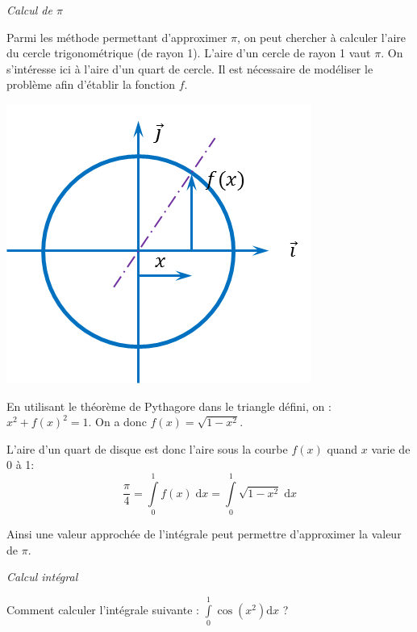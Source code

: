\documentclass[10pt]{article}
\begin{document}
\begin{exemple}
\textit{Calcul de $\pi$}

\begin{minipage}[c]{.7\linewidth}
Parmi les méthode permettant d'approximer $\pi$, on peut chercher à calculer l'aire du cercle trigonométrique (de rayon 1). L'aire d'un cercle de rayon 1 vaut $\pi$. On s'intéresse ici à l'aire d'un quart de cercle. Il est nécessaire de modéliser le problème afin d'établir la fonction $f$.

\end{minipage}\hfill
\begin{minipage}[c]{.25\linewidth}
\begin{center}
\includegraphics[width=.95\textwidth]{images/cercle}
\end{center}
\end{minipage}

En utilisant le théorème de Pythagore dans le triangle défini, on : $x^2 + f(x)^2 = 1$. On a donc $f(x)=\sqrt{1-x^2}$. 

L'aire d'un quart de disque est donc l'aire sous la courbe $f(x)$ quand $x$ varie de 0 à 1:
$$
\dfrac{\pi}{4}=\int\limits_{0}^1 f(x) \; \mathrm{d} x =\int\limits_{0}^1\sqrt{1-x^2} \; \mathrm{d} x
$$

Ainsi une valeur approchée de l'intégrale peut permettre d'approximer la valeur de $\pi$.
\end{exemple}
 
\begin{exemple}
\textit{Calcul intégral}

Comment calculer l'intégrale suivante : $\int\limits_{0}^1 \cos \left(x^2\right) \mathrm{d} x$ ?
\end{exemple}
\end{document}
